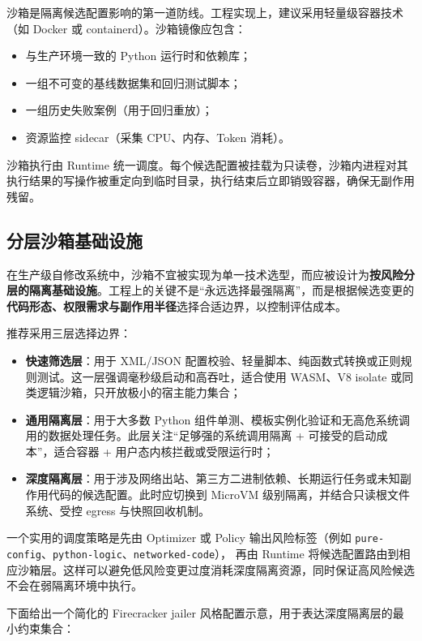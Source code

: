 沙箱是隔离候选配置影响的第一道防线。工程实现上，建议采用轻量级容器技术（如 Docker 或 containerd）。沙箱镜像应包含：
\begin{itemize}
    \item 与生产环境一致的 Python 运行时和依赖库；
    \item 一组不可变的基线数据集和回归测试脚本；
    \item 一组历史失败案例（用于回归重放）；
    \item 资源监控 sidecar（采集 CPU、内存、Token 消耗）。
\end{itemize}

沙箱执行由 Runtime 统一调度。每个候选配置被挂载为只读卷，沙箱内进程对其执行结果的写操作被重定向到临时目录，执行结束后立即销毁容器，确保无副作用残留。

\subsection{分层沙箱基础设施}

在生产级自修改系统中，沙箱不宜被实现为单一技术选型，而应被设计为\textbf{按风险分层的隔离基础设施}。工程上的关键不是“永远选择最强隔离”，而是根据候选变更的\textbf{代码形态、权限需求与副作用半径}选择合适边界，以控制评估成本。

推荐采用三层选择边界：
\begin{itemize}
    \item \textbf{快速筛选层}：用于 XML/JSON 配置校验、轻量脚本、纯函数式转换或正则规则测试。这一层强调毫秒级启动和高吞吐，适合使用 WASM、V8 isolate 或同类逻辑沙箱，只开放极小的宿主能力集合；
    \item \textbf{通用隔离层}：用于大多数 Python 组件单测、模板实例化验证和无高危系统调用的数据处理任务。此层关注“足够强的系统调用隔离 + 可接受的启动成本”，适合容器 + 用户态内核拦截或受限运行时；
    \item \textbf{深度隔离层}：用于涉及网络出站、第三方二进制依赖、长期运行任务或未知副作用代码的候选配置。此时应切换到 MicroVM 级别隔离，并结合只读根文件系统、受控 egress 与快照回收机制。
\end{itemize}

一个实用的调度策略是先由 Optimizer 或 Policy 输出风险标签（例如
\texttt{pure-config}、\texttt{python-logic}、\texttt{networked-code}），
再由 Runtime 将候选配置路由到相应沙箱层。这样可以避免低风险变更过度消耗深度隔离资源，同时保证高风险候选不会在弱隔离环境中执行。

下面给出一个简化的 Firecracker jailer 风格配置示意，用于表达深度隔离层的最小约束集合：

